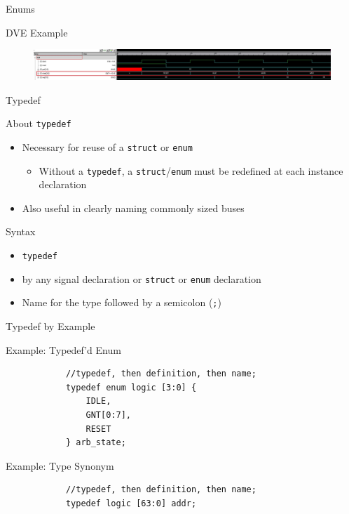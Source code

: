 \documentclass[dvipsnames]{beamer}
\begin{document}
\begin{frame}{Enums}
	\begin{block}{DVE Example}
		\begin{figure}[h]
			\centering
			\includegraphics[width=1\textwidth,clip,trim=0 0 10cm 0]{enum_dve.jpg}
		\end{figure}
	\end{block}
\end{frame}

\begin{frame}[fragile]{Typedef}
	\begin{block}{About \texttt{typedef}}
		\begin{itemize}
			\item Necessary for reuse of a \texttt{struct} or \texttt{enum}
				\begin{itemize}
					\item Without a \texttt{typedef}, a
						\texttt{struct}/\texttt{enum} must be redefined
						at each instance declaration
				\end{itemize}
			\item Also useful in clearly naming commonly sized buses
		\end{itemize}
	\end{block}
	\begin{block}{Syntax}
		\begin{itemize}
			\item \texttt{typedef}
			\item by any signal declaration or \texttt{struct} or \texttt{enum}
				declaration
			\item Name for the type followed by a semicolon (\texttt{;})
		\end{itemize}
	\end{block}
\end{frame}

\begin{frame}[fragile]{Typedef by Example}
	\begin{block}{Example: Typedef'd Enum}
		\vspace*{-12pt}
		\begin{verbatim}
			//typedef, then definition, then name;
			typedef enum logic [3:0] {
			    IDLE,     
			    GNT[0:7], 
			    RESET     
			} arb_state;
		\end{verbatim}
	\end{block}
	\begin{block}{Example: Type Synonym}
		\vspace*{-12pt}
		\begin{verbatim}
			//typedef, then definition, then name;
			typedef logic [63:0] addr;
		\end{verbatim}
	\end{block}
\end{frame}
\end{document}
